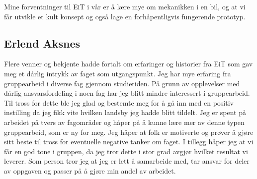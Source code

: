 Mine forventninger til EiT i vår er å lære mye om mekanikken i en bil, og at 
vi får utvikle et kult konsept og også lage en forhåpentligvis fungerende prototyp.

\subsection{Erlend Aksnes} Flere venner og bekjente hadde fortalt om erfaringer og historier fra EiT som gav meg et dårlig intrykk av faget som utgangspunkt. 
Jeg har mye erfaring fra gruppearbeid i diverse fag gjennom studietiden.
 På grunn av opplevelser med dårlig ansvarsfordeling i noen fag har jeg blitt mindre interessert i gruppearbeid. 
Til tross for dette ble jeg glad og bestemte meg for å gå inn med en positiv instilling da jeg fikk vite hvilken landsby jeg hadde blitt tildelt. 
Jeg er spent på arbeidet på tvers av fagområder og håper på å kunne lære mer av denne typen gruppearbeid, som er ny for meg.  
Jeg håper at folk er motiverte og prøver å gjøre sitt beste til tross for eventuelle negative tanker om faget. 
I tillegg håper jeg at vi får en god tone i gruppen, da jeg tror dette i stor grad avgjør hvilket resultat vi leverer. 
Som person tror jeg at jeg er lett å samarbeide med, tar ansvar for deler av oppgaven og passer på å gjøre min andel av arbeidet. 

